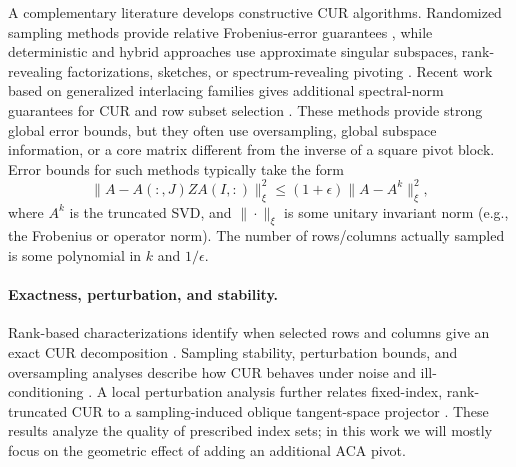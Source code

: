 \documentclass[11pt, preprint]{article}
\begin{document}
A complementary literature develops constructive CUR algorithms. Randomized
sampling methods provide relative Frobenius-error guarantees
\cite{Drineas_RelativeErrorCUR2008,Wang_AdaptiveCURNystrom2013,
Boutsidis_OptimalCUR2017}, while deterministic and hybrid approaches use
approximate singular subspaces, rank-revealing factorizations, sketches, or
spectrum-revealing pivoting
\cite{Sorensen_DEIMCUR2016,Cortinovis_FrobeniusSubset2020,
Voronin_EfficientCUR2017,Dong_RandomizedCUR2023,
Anderson_SpectralGapCUR2015,Chen_SpectrumRevealingCUR2020}.
Recent work based on generalized interlacing families gives additional
spectral-norm guarantees for CUR and row subset selection
\cite{Cai_GeneralizedInterlacingCUR2025}. These methods provide strong global
error bounds, but they often use oversampling, global subspace information, or
a core matrix different from the inverse of a square pivot block. Error bounds for such methods typically take the form \[
\|A - A(:,J)ZA(I,:)\|_\xi^2 \leq (1+\epsilon)\|A-A^k\|_\xi^2,
\]
where $A^k$ is the truncated SVD, and $\|\cdot\|_\xi$ is some unitary invariant norm (e.g., the Frobenius or operator norm). The number of rows/columns actually sampled is some polynomial in $k$ and $1/\epsilon$. 

\paragraph{Exactness, perturbation, and stability.}
Rank-based characterizations identify when selected rows and columns give an
exact CUR decomposition \cite{Hamm_PerspectivesCUR2020}. Sampling stability,
perturbation bounds, and oversampling analyses describe how CUR behaves under
noise and ill-conditioning
\cite{Hamm_StabilitySamplingCUR2020,Hamm_PerturbationsCUR2021,
Park_CURStabilityOversampling2025}. A local perturbation analysis further
relates fixed-index, rank-truncated CUR to a sampling-induced oblique
tangent-space projector \cite{Huang_LocalTangentCUR2026}. These results analyze
the quality of prescribed index sets; in this work we will mostly focus on the geometric effect of adding an additional ACA pivot.
\end{document}
